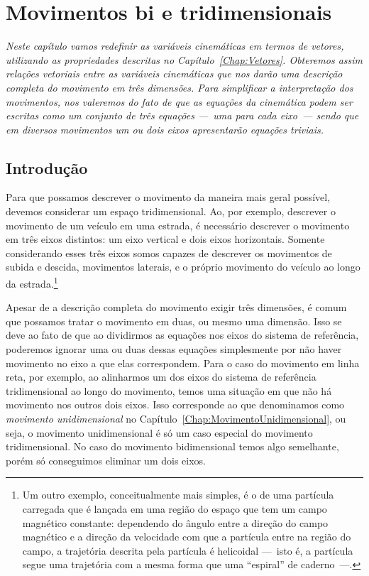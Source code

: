 \chapter{Movimentos bi e tridimensionais}
\label{Chap:MovimentoBidimensional}


\begin{fullwidth}
{\it
Neste capítulo vamos redefinir as variáveis cinemáticas em termos de vetores, utilizando as propriedades descritas no Capítulo~\ref{Chap:Vetores}. Obteremos assim relações vetoriais entre as variáveis cinemáticas que nos darão uma descrição completa do movimento em três dimensões. Para simplificar a interpretação dos movimentos, nos valeremos do fato de que as equações da cinemática podem ser escritas como um conjunto de três equações ---~uma para cada eixo~--- sendo que em diversos movimentos um ou dois eixos apresentarão equações triviais.
}
\end{fullwidth}

\section{Introdução}

Para que possamos descrever o movimento da maneira mais geral possível, devemos considerar um espaço tridimensional. Ao, por exemplo, descrever o movimento de um veículo em uma estrada, é necessário descrever o movimento em três eixos distintos: um eixo vertical e dois eixos horizontais. Somente considerando esses três eixos somos capazes de descrever os movimentos de subida e descida, movimentos laterais, e o próprio movimento do veículo ao longo da estrada.\footnote{Um outro exemplo, conceitualmente mais simples, é o de uma partícula carregada que é lançada em uma região do espaço que tem um campo magnético constante: dependendo do ângulo entre a direção do campo magnético e a direção da velocidade com que a partícula entre na região do campo, a trajetória descrita pela partícula é helicoidal ---~isto é, a partícula segue uma trajetória com a mesma forma que uma ``espiral'' de caderno~---.} 

Apesar de a descrição completa do movimento exigir três dimensões, é comum que possamos tratar o movimento em duas, ou mesmo uma dimensão. Isso se deve ao fato de que ao dividirmos as equações nos eixos do sistema de referência, poderemos ignorar uma ou duas dessas equações simplesmente por não haver movimento no eixo a que elas correspondem. Para o caso do movimento em linha reta, por exemplo, ao alinharmos um dos eixos do sistema de referência tridimensional ao longo do movimento, temos uma situação em que não há movimento nos outros dois eixos. Isso corresponde ao que denominamos como \emph{movimento unidimensional} no Capítulo~\ref{Chap:MovimentoUnidimensional}, ou seja, o movimento unidimensional é só um caso especial do movimento tridimensional. No caso do movimento bidimensional temos algo semelhante, porém só conseguimos eliminar um dois eixos.

